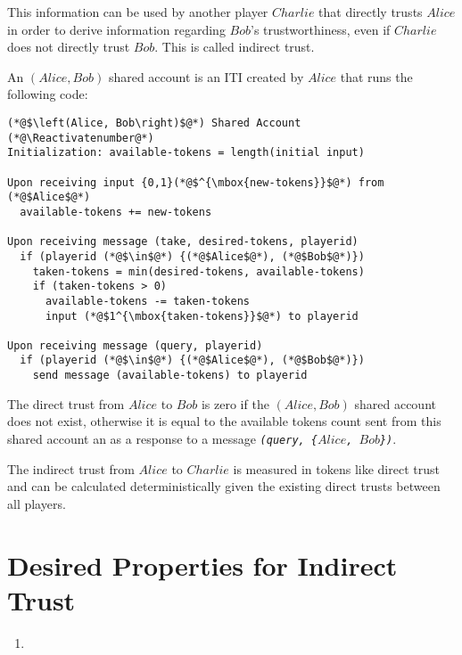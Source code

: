   This information can be used by another player $Charlie$ that directly trusts $Alice$ in order to derive information
  regarding $Bob$'s trustworthiness, even if $Charlie$ does not directly trust $Bob$. This is called indirect trust.

  \begin{definition}
    An $\left(Alice, Bob\right)$ shared account is an ITI created by $Alice$ that runs the following code:
  \end{definition}
  \Suppressnumber
  \begin{lstlisting}[label=sharedaccount, style=numbers]
(*@$\left(Alice, Bob\right)$@*) Shared Account
(*@\Reactivatenumber@*)
Initialization: available-tokens = length(initial input)

Upon receiving input {0,1}(*@$^{\mbox{new-tokens}}$@*) from (*@$Alice$@*)
  available-tokens += new-tokens

Upon receiving message (take, desired-tokens, playerid)
  if (playerid (*@$\in$@*) {(*@$Alice$@*), (*@$Bob$@*)})
    taken-tokens = min(desired-tokens, available-tokens)
    if (taken-tokens > 0)
      available-tokens -= taken-tokens
      input (*@$1^{\mbox{taken-tokens}}$@*) to playerid

Upon receiving message (query, playerid)
  if (playerid (*@$\in$@*) {(*@$Alice$@*), (*@$Bob$@*)})
    send message (available-tokens) to playerid
  \end{lstlisting}
  \begin{definition}
    The direct trust from $Alice$ to $Bob$ is zero if the $\left(Alice, Bob\right)$ shared account does not exist, otherwise it
    is equal to the available tokens count sent from this shared account an as a response to a message \emph{\texttt{(query,
    \{}$Alice$\texttt{, }$Bob$\texttt{\})}}.
  \end{definition}

  \begin{definition}
    The indirect trust from $Alice$ to $Charlie$ is measured in tokens like direct trust and can be calculated
    deterministically given the existing direct trusts between all players.
  \end{definition}

\section{Desired Properties for Indirect Trust}
  \begin{enumerate}
    \item 
  \end{enumerate}
